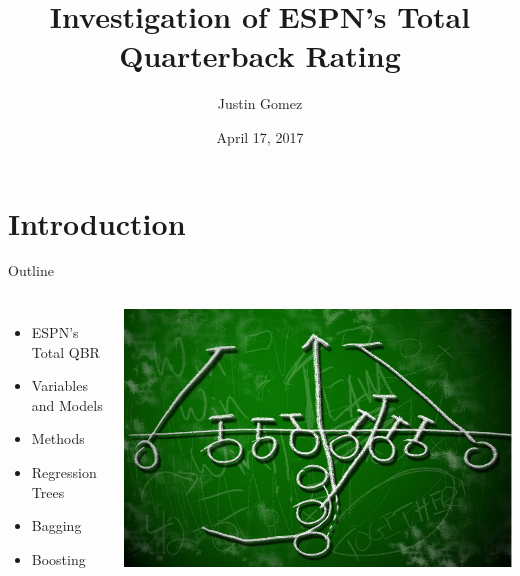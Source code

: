 \documentclass{beamer}
\title[ESPN's Total QBR]{Investigation of ESPN's Total Quarterback Rating}
\author{Justin Gomez}
\institute{Montana State University}
\date{April 17, 2017}
\begin{document}
	
	\begin{frame}
		\titlepage
	\end{frame}
	
	
	\section{Introduction}
	
	\begin{frame}{Outline}
		\begin{columns}
			\begin{itemize}
				\item ESPN's Total QBR
				\item Variables and Models
				\item Methods
				\item Regression Trees
				\item Bagging
				\item Boosting
			\end{itemize}
			\includegraphics[scale=.2]{football-strategy.jpg}
		\end{columns}
	\end{frame}
	
\end{document}
